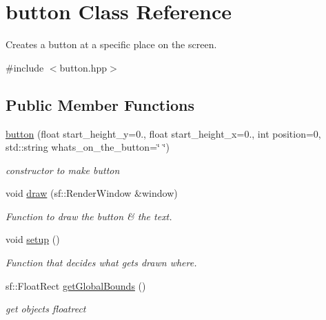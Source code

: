 \hypertarget{classbutton}{}\section{button Class Reference}
\label{classbutton}


Creates a button at a specific place on the screen.  




{\ttfamily \#include $<$button.\+hpp$>$}

\subsection*{Public Member Functions}
\begin{DoxyCompactItemize}
\item 
\hyperlink{classbutton_a414300b6e7efb981b90b0fef111f133c}{button} (float start\+\_\+height\+\_\+y=0., float start\+\_\+height\+\_\+x=0., int position=0, std\+::string whats\+\_\+on\+\_\+the\+\_\+button=\char`\"{} \char`\"{})
\begin{DoxyCompactList}\small\item\em constructor to make button \end{DoxyCompactList}\item 
void \hyperlink{classbutton_adae3f830089f26d5c43a7f5681591364}{draw} (sf\+::\+Render\+Window \&window)
\begin{DoxyCompactList}\small\item\em Function to draw the button \& the text. \end{DoxyCompactList}\item 
void \hyperlink{classbutton_aaa445c71f07d867926dfcd57016064e6}{setup} ()
\begin{DoxyCompactList}\small\item\em Function that decides what gets drawn where. \end{DoxyCompactList}\item 
sf\+::\+Float\+Rect \hyperlink{classbutton_a4066a4598a5f190a536b5f3a60e3d208}{get\+Global\+Bounds} ()
\begin{DoxyCompactList}\small\item\em get objects floatrect \end{DoxyCompactList}\end{DoxyCompactItemize}
